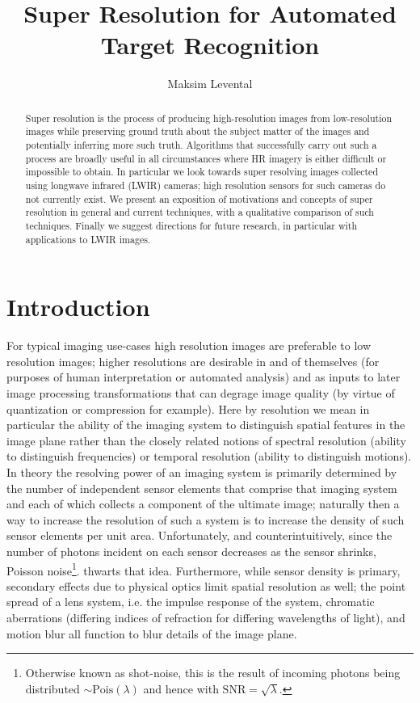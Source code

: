 \documentclass[journal]{IEEEtran}
\begin{document}
    \title{Super Resolution for Automated Target Recognition}
    \author{Maksim Levental}
    \maketitle

    \begin{abstract}
        Super resolution is the process of producing high-resolution images from low-resolution
        images while preserving ground truth about the subject matter of the images and potentially
        inferring more such truth. Algorithms that successfully carry out
        such a process are broadly useful in all circumstances where HR imagery is either difficult or impossible
        to obtain. In particular we look towards super resolving images collected using longwave infrared (LWIR)
        cameras; high resolution sensors for such cameras do not currently exist. We present an exposition of
        motivations and concepts of super resolution in general and current techniques, with a qualitative comparison of
        such techniques. Finally we suggest directions for future research, in particular with applications to LWIR images.
    \end{abstract}

    \section{Introduction}\label{sec:introduction}

    For typical imaging use-cases high resolution images are preferable to low resolution images; higher resolutions are
    desirable in and of themselves (for purposes of human interpretation or automated analysis) and as inputs to later
    image processing transformations that can degrage image quality (by virtue of quantization or compression for example).
    Here by resolution we mean in particular the ability of the imaging system to distinguish spatial features in
    the image plane rather than the closely related notions of spectral resolution (ability to distinguish frequencies)
    or temporal resolution (ability to distinguish motions). In theory the resolving power of an imaging system is
    primarily determined by the number of independent sensor elements that comprise that imaging system and each of
    which collects a component of the ultimate image; naturally then a way to increase the resolution of such a system
    is to increase the density of such sensor elements
    per unit area. Unfortunately, and counterintuitively, since the number of photons incident on each sensor decreases
    as the sensor shrinks, Poisson noise\footnote{Otherwise known as shot-noise, this is the result of incoming photons
    being distributed $\sim\text{Pois}(\lambda)$ and hence with $\text{SNR} = \sqrt{\lambda}$.}. thwarts that idea.
    Furthermore, while sensor density is primary, secondary effects due to physical optics limit spatial resolution as well;
    the point spread of a lens system, i.e. the impulse response of the system, chromatic aberrations (differing indices of
    refraction for differing wavelengths of light), and motion blur all function to blur details of the image plane.
\end{document}
